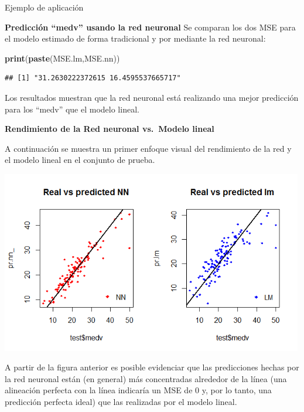 \documentclass[
  ignorenonframetext,
]{beamer}
\newenvironment{Shaded}{\begin{snugshade}}{\end{snugshade}}
\newcommand{\KeywordTok}[1]{\textcolor[rgb]{0.13,0.29,0.53}{\textbf{#1}}}
\newcommand{\NormalTok}[1]{#1}
\begin{document}
\begin{frame}[fragile]{Ejemplo de aplicación}
\begin{block}{}
\begin{block}{\textbf{Predicción ``medv'' usando la red neuronal}}
Se comparan los dos MSE para el modelo estimado de forma tradicional y
por mediante la red neuronal:

\begin{Shaded}
\begin{Highlighting}[]
\KeywordTok{print}\NormalTok{(}\KeywordTok{paste}\NormalTok{(MSE.lm,MSE.nn))}
\end{Highlighting}
\end{Shaded}

\begin{verbatim}
## [1] "31.2630222372615 16.4595537665717"
\end{verbatim}

Los resultados muestran que la red neuronal está realizando una mejor
predicción para los ``medv'' que el modelo lineal.

\end{block}

\end{block}

\begin{block}{}

\begin{block}{\textbf{Rendimiento de la Red neuronal vs.~Modelo lineal}}

A continuación se muestra un primer enfoque visual del rendimiento de la
red y el modelo lineal en el conjunto de prueba.

\includegraphics[width=5.20833in,height=\textheight]{salida1.png}

A partir de la figura anterior es posible evidenciar que las
predicciones hechas por la red neuronal están (en general) más
concentradas alrededor de la línea (una alineación perfecta con la línea
indicaría un MSE de 0 y, por lo tanto, una predicción perfecta ideal)
que las realizadas por el modelo lineal.


\end{block}
\end{block}
\end{frame}
\end{document}

